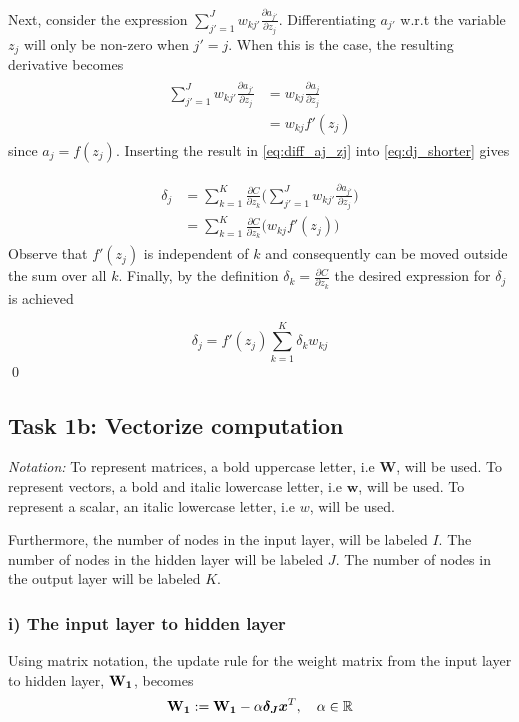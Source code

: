 \documentclass{article}
\begin{document}
Next, consider the expression $\sum_{j'=1}^J w_{kj'} \frac{\partial a_{j'}}{\partial z_j}$. Differentiating $a_{j'}$ w.r.t the variable $z_j$ will only be non-zero when $j' = j$. When this is the case, the resulting derivative becomes
\begin{align}
\begin{split}
    \sum_{j'=1}^J w_{kj'} \frac{\partial a_{j'}}{\partial z_j} &= w_{kj}\frac{\partial a_j}{\partial z_j} \\ &= w_{kj} f'(z_j)
\end{split}
\label{eq:diff_aj_zj}
\end{align}
since $a_j = f(z_j)$. Inserting the result in \eqref{eq:diff_aj_zj} into \eqref{eq:dj_shorter} gives

\begin{align}
\begin{split}
     \delta_j &= \sum_{k=1}^K \frac{\partial C}{\partial z_k} \bigg(\sum_{j'=1}^J w_{kj'} \frac{\partial a_{j'}}{\partial z_j} \bigg) \\
     &=\sum_{k=1}^K \frac{\partial C}{\partial z_k} \bigg( w_{kj} f'(z_j)\bigg)
\end{split}
\label{eq:almost_there}
\end{align}
Observe that $f'(z_j)$ is independent of $k$ and consequently can be moved outside the sum over all $k$. Finally, by the definition $\delta_k = \frac{\partial C}{\partial z_k}$ the desired expression for $\delta_j$ is achieved

\begin{equation}
    \delta_j = f'(z_j) \sum_{k=1}^K \delta_k w_{kj}
\end{equation}
\qed
\subsection{Task 1b: Vectorize computation}
\textit{Notation:} To represent matrices, a bold uppercase letter, i.e \textbf{W}, will be used. To represent vectors, a bold and italic lowercase letter, i.e $\boldsymbol{w}$, will be used. To represent a scalar, an italic lowercase letter, i.e $w$, will be used. 

Furthermore, the number of nodes in the input layer, will be labeled $I$. The number of nodes in the hidden layer will be labeled $J$. The number of nodes in the output layer will be labeled $K$.





\subsubsection*{i) The input layer to hidden layer} 
Using matrix notation, the update rule for the weight matrix from the input layer to hidden layer, $\text{\textbf{W}}_\textbf{1}$, becomes 
\begin{equation}
    \text{\textbf{W}}_\textbf{1} := \text{\textbf{W}}_\textbf{1} - \alpha \boldsymbol{\delta_J} \boldsymbol{x}^T, \quad \alpha \in \mathbb{R}
    \label{eq:matrix_hidden}
\end{equation}
\end{document}
